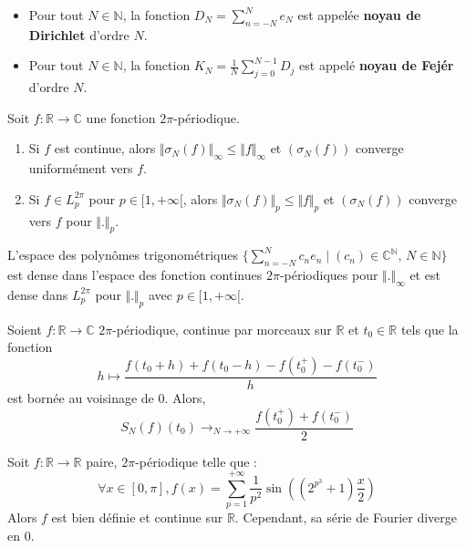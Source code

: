 
	\begin{example}
		\begin{itemize}
			\item Pour tout $N \in \mathbb{N}$, la fonction $D_N = \sum_{n=-N}^{N} e_N$ est appelée \textbf{noyau de Dirichlet} d'ordre $N$.
			\item Pour tout $N \in \mathbb{N}$, la fonction $K_N = \frac{1}{N} \sum_{j=0}^{N-1} D_j$ est appelé \textbf{noyau de Fejér} d'ordre $N$.
		\end{itemize}
	\end{example}


	\begin{theorem}[Fejér]
		Soit $f : \mathbb{R} \rightarrow \mathbb{C}$ une fonction $2\pi$-périodique.
		\begin{enumerate}[label=(\roman*)]
			\item Si $f$ est continue, alors $\Vert \sigma_N(f) \Vert_\infty \leq \Vert f \Vert_\infty$ et $(\sigma_N(f))$ converge uniformément vers $f$.
			\item Si $f \in L_p^{2\pi}$ pour $p \in [1,+\infty[$, alors $\Vert \sigma_N(f) \Vert_p \leq \Vert f \Vert_p$ et $(\sigma_N(f))$ converge vers $f$ pour $\Vert . \Vert_p$.
		\end{enumerate}
	\end{theorem}

	\begin{corollary}
		L'espace des polynômes trigonométriques $\{ \sum_{n=-N}^N c_n e_n \mid (c_n) \in \mathbb{C}^{\mathbb{N}}, \, N \in \mathbb{N} \}$ est dense dans l'espace des fonction continues $2\pi$-périodiques pour $\Vert . \Vert_\infty$ et est dense dans $L_p^{2\pi}$ pour $\Vert . \Vert_p$ avec $p \in [1,+\infty[$.
	\end{corollary}


	\begin{theorem}[Dirichlet]
		Soient $f : \mathbb{R} \rightarrow \mathbb{C}$ $2\pi$-périodique, continue par morceaux sur $\mathbb{R}$ et $t_0 \in \mathbb{R}$ tels que la fonction
		\[ h \mapsto \frac{f(t_0 + h) + f(t_0 - h) - f(t_0^+) - f(t_0^-)}{h} \]
		est bornée au voisinage de $0$. Alors,
		\[ S_N(f)(t_0) \longrightarrow_{N \rightarrow +\infty} \frac{f(t_0^+) + f(t_0^-)}{2} \]
	\end{theorem}

	\begin{cexample}
		Soit $f : \mathbb{R} \rightarrow \mathbb{R}$ paire, $2\pi$-périodique telle que :
		\[ \forall x \in [0, \pi], f(x) = \sum_{p=1}^{+\infty} \frac{1}{p^2} \sin \left( (2^{p^3} + 1) \frac{x}{2} \right)
		\]
		Alors $f$ est bien définie et continue sur $\mathbb{R}$. Cependant, sa série de Fourier diverge en $0$.
	\end{cexample}


